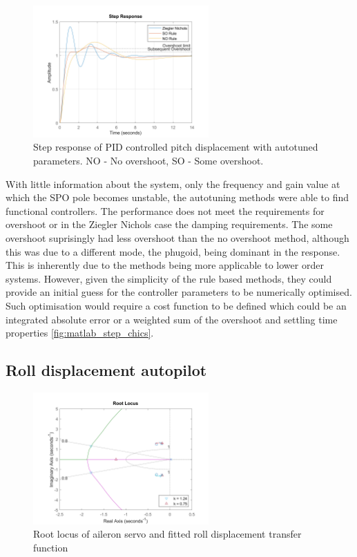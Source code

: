 \documentclass{article}
\begin{document}
\begin{figure}[H]
    \centering
    \includegraphics[width=0.6\textwidth]{figures/pitch_autopilot_autotuning_comparison.png}
    \caption{Step response of PID controlled pitch displacement with autotuned parameters. NO - No overshoot, SO - Some overshoot.}
    \label{fig:pitch_autopilot_autotune_step}
\end{figure}

With little information about the system, only the frequency and gain value at which the SPO pole becomes unstable, the autotuning methods were able to find functional controllers.
The performance does not meet the requirements for overshoot or in the Ziegler Nichols case the damping requirements.
The some overshoot suprisingly had less overshoot than the no overshoot method, although this was due to a different mode, the phugoid, being dominant in the response.
This is inherently due to the methods being more applicable to lower order systems.
However, given the simplicity of the rule based methods, they could provide an initial guess for the controller parameters to be numerically optimised.
Such optimisation would require a cost function to be defined which could be an integrated absolute error or a weighted sum of the overshoot and settling time properties \ref{fig:matlab_step_chics}.

\subsection{Roll displacement autopilot}

\begin{figure}[H]
    \centering
    \includegraphics[width=0.6\textwidth]{figures/roll_autopilot_locus_uncompensated.png}
    \caption{Root locus of aileron servo and fitted roll displacement transfer function}
    \label{fig:roll_autopilot_uncompensated_locus}
\end{figure}
\end{document}
